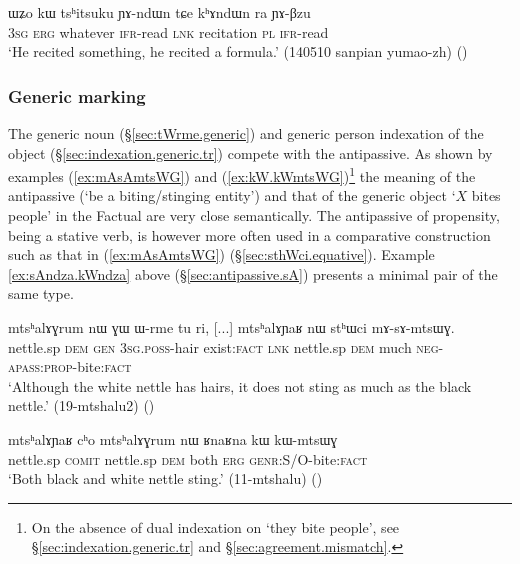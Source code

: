 \begin{exe}
\ex \label{ex:tshitsuku.YAndWn}
\gll ɯʑo kɯ tsʰitsuku ɲɤ-ndɯn tɕe kʰɤndɯn ra ɲɤ-βzu \\
\textsc{3sg} \textsc{erg} whatever \textsc{ifr}-read \textsc{lnk} recitation \textsc{pl} \textsc{ifr}-read \\
\glt `He recited something, he recited a formula.' (140510 sanpian yumao-zh)
()
\end{exe}

\subsubsection{Generic marking  } \label{sec:antipassive.vs.generic}
The generic noun  (§\ref{sec:tWrme.generic}) and generic person indexation of the object (§\ref{sec:indexation.generic.tr}) compete with the  antipassive. As shown by examples (\ref{ex:mAsAmtsWG}) and (\ref{ex:kW.kWmtsWG})\footnote{On the absence of dual indexation on  `they bite people', see §\ref{sec:indexation.generic.tr} and §\ref{sec:agreement.mismatch}. } the meaning of the antipassive  (`be a biting/stinging entity') and that of the generic object  `$X$ bites people' in the Factual are very close semantically. The antipassive of propensity, being a stative verb, is however more often used in a comparative construction such as that in (\ref{ex:mAsAmtsWG}) (§\ref{sec:sthWci.equative}).  Example \ref{ex:sAndza.kWndza} above (§\ref{sec:antipassive.sA}) presents a minimal pair of the same type.
 
\begin{exe}
\ex \label{ex:mAsAmtsWG}
\gll mtsʰalɤɣrum nɯ ɣɯ ɯ-rme tu ri, [...] mtsʰalɤɲaʁ nɯ stʰɯci mɤ-sɤ-mtsɯɣ. \\
nettle.sp \textsc{dem} \textsc{gen} \textsc{3sg}.\textsc{poss}-hair exist:\textsc{fact} \textsc{lnk} { } nettle.sp \textsc{dem} much \textsc{neg}-\textsc{apass}:\textsc{prop}-bite:\textsc{fact} \\
\glt `Although the white nettle has hairs, it does not sting as much as the black nettle.' (19-mtshalu2) ()
\end{exe}

\begin{exe}
\ex \label{ex:kW.kWmtsWG}
\gll  mtsʰalɤɲaʁ cʰo mtsʰalɤɣrum nɯ ʁnaʁna kɯ kɯ-mtsɯɣ \\
nettle.sp \textsc{comit} nettle.sp  \textsc{dem} both \textsc{erg} \textsc{genr}:S/O-bite:\textsc{fact} \\
\glt `Both black and white nettle sting.' (11-mtshalu)
() 
\end{exe}

